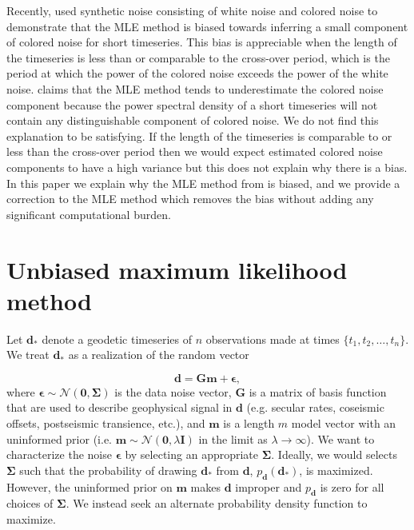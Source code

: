 \documentclass[10pt,a4paper]{article}
\begin{document}
Recently, \citep{Langbein2012} used synthetic noise consisting of white noise and colored noise to demonstrate that the MLE method is biased towards inferring a small component of colored noise for short timeseries.  This bias is appreciable when the length of the timeseries is less than or comparable to the cross-over period, which is the period at which the power of the colored noise exceeds the power of the white noise. \citet{Langbein2012} claims that the MLE method tends to underestimate the colored noise component because the power spectral density of a short timeseries will not contain any distinguishable component of colored noise. We do not find this explanation to be satisfying. If the length of the timeseries is comparable to or less than the cross-over period then we would expect estimated colored noise components to have a high variance but this does not explain why there is a bias. In this paper we explain why the MLE method from \citet{Langbein1997} is biased, and we provide a correction to the MLE method which removes the bias without adding any significant computational burden. 

\section{Unbiased maximum likelihood method}

Let $\mathbf{d_*}$ denote a geodetic timeseries of $n$ observations made at times $\{t_1,t_2,\dots,t_n\}$. We treat $\mathbf{d_*}$ as a realization of the random vector

\begin{equation}\label{LangbeinModel}
  \mathbf{d} = \mathbf{Gm} + \mathbf{\epsilon},
\end{equation}
where $\mathbf{\epsilon} \sim \mathcal{N}(\mathbf{0},\mathbf{\Sigma})$ is the data noise vector, $\mathbf{G}$ is a matrix of basis function that are used to describe geophysical signal in $\mathbf{d}$ (e.g. secular rates, coseismic offsets, postseismic transience, etc.), and $\mathbf{m}$ is a length $m$ model vector with an uninformed prior (i.e. $\mathbf{m} \sim \mathcal{N}(\mathbf{0},\lambda\mathbf{I})$ in the limit as $\lambda \to \infty$). We want to characterize the noise $\mathbf{\epsilon}$ by selecting an appropriate $\mathbf{\Sigma}$. Ideally, we would selects $\mathbf{\Sigma}$ such that the probability of drawing $\mathbf{d_*}$ from $\mathbf{d}$, $p_\mathbf{d}(\mathbf{d_*})$, is maximized.  However, the uninformed prior on $\mathbf{m}$ makes $\mathbf{d}$ improper and $p_\mathbf{d}$ is zero for all choices of $\mathbf{\Sigma}$. We instead seek an alternate probability density function to maximize. 
\end{document}
